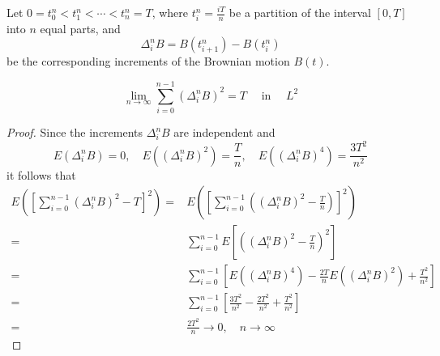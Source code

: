 Let $0=t_{0}^{n}<t_{1}^{n}<\cdots<t_{n}^{n}=T$, where $t_{i}^{n}=\frac{iT}{n}$ be a partition of the interval $[0,T]$ into $n$ equal parts, and
\begin{equation}
    \Delta_{i}^{n}B=B\left(t_{i+1}^{n}\right)-B\left(t_{i}^{n}\right)
\end{equation}
be the corresponding increments of the Brownian motion $B(t)$.

\begin{theorem} \label{thm:limited-square-variation}
    \begin{equation}
        \lim_{n\rightarrow\infty}\sum_{i=0}^{n-1}\left(\Delta_{i}^{n}B\right)^{2}=T\quad\text { in }\quad L^{2}
    \end{equation}
\end{theorem}

\begin{proof}
    Since the increments $\Delta_{i}^{n}B$ are independent and
    \begin{equation*}
        E\left(\Delta_{i}^{n}B\right)=0,\quad E\left(\left(\Delta_{i}^{n}B\right)^{2}\right)=\frac{T}{n},\quad E\left(\left(\Delta_{i}^{n}B\right)^{4}\right)=\frac{3T^{2}}{n^{2}}
    \end{equation*}
    it follows that
    \begin{equation*}
        \begin{aligned}
            E\left(\left[\sum_{i=0}^{n-1}\left(\Delta_{i}^{n}B\right)^{2}-T\right]^{2}\right)= & E\left(\left[\sum_{i=0}^{n-1}\left(\left(\Delta_{i}^{n}B\right)^{2}-\frac{T}{n}\right)\right]^{2}\right)                                                   \\
            =                                                                                  & \sum_{i=0}^{n-1}E\left[\left(\left(\Delta_{i}^{n}B\right)^{2}-\frac{T}{n}\right)^{2}\right]                                                                \\
            =                                                                                  & \sum_{i=0}^{n-1}\left[E\left(\left(\Delta_{i}^{n}B\right)^{4}\right)-\frac{2T}{n}E\left(\left(\Delta_{i}^{n}B\right)^{2}\right)+\frac{T^{2}}{n^{2}}\right] \\
            =                                                                                  & \sum_{i=0}^{n-1}\left[\frac{3T^{2}}{n^{2}}-\frac{2T^{2}}{n^{2}}+\frac{T^{2}}{n^{2}}\right]                                                                 \\
            =                                                                                  & \frac{2T^{2}}{n}\rightarrow 0,\quad n\rightarrow\infty
        \end{aligned}
    \end{equation*}
\end{proof}

